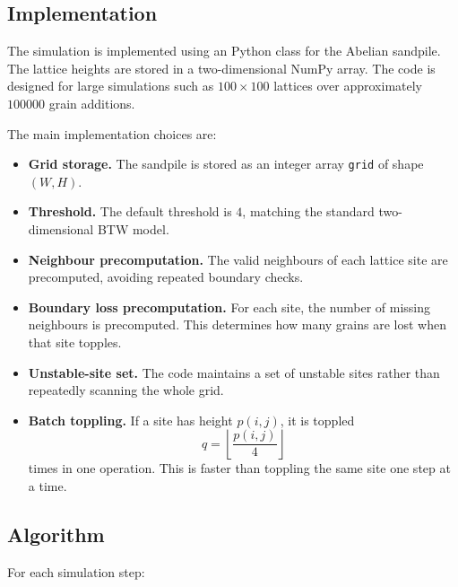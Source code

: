 \documentclass[11pt]{article}
\begin{document}
\subsection{Implementation}

The simulation is implemented using an Python class for the Abelian sandpile. 
The lattice heights are stored in a two-dimensional NumPy array. 
The code is designed for large simulations such as \(100\times 100\) lattices over approximately \(100000\) grain additions.

The main implementation choices are:

\begin{itemize}
    \item \textbf{Grid storage.} The sandpile is stored as an integer array \texttt{grid} of shape \((W,H)\).

    \item \textbf{Threshold.} The default threshold is \(4\), matching the standard two-dimensional BTW model.

    \item \textbf{Neighbour precomputation.} The valid neighbours of each lattice site are precomputed, avoiding repeated boundary checks.

    \item \textbf{Boundary loss precomputation.} For each site, the number of missing neighbours is precomputed. 
    This determines how many grains are lost when that site topples.

    \item \textbf{Unstable-site set.} The code maintains a set of unstable sites rather than repeatedly scanning the whole grid.

    \item \textbf{Batch toppling.} If a site has height \(p(i,j)\), it is toppled
    \[
        q=\left\lfloor \frac{p(i,j)}{4}\right\rfloor
    \]
    times in one operation. 
    This is faster than toppling the same site one step at a time.
\end{itemize}

\subsection{Algorithm}

For each simulation step:
\end{document}
